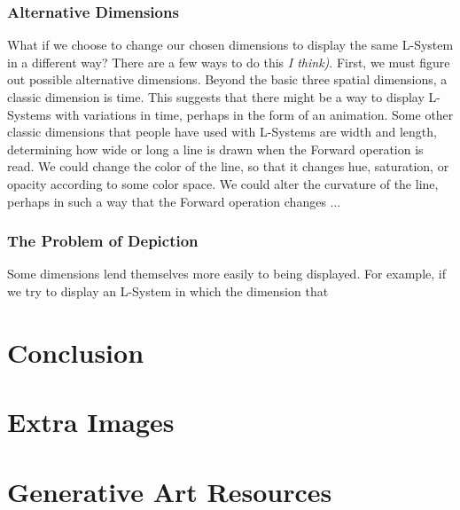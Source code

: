 \documentclass[12pt,twoside]{reedthesis}
\begin{document}
\subsection{Alternative Dimensions}
What if we choose to change our chosen dimensions to display the same L-System in a different way? There are a few ways to do this \textit{I think)}. First, we must figure out possible alternative dimensions. Beyond the basic three spatial dimensions, a classic dimension is time. This suggests that there might be a way to display L-Systems with variations in time, perhaps in the form of an animation. Some other classic dimensions that people have used with L-Systems are width and length, determining how wide or long a line is drawn when the Forward operation is read. We could change the color of the line, so that it changes hue, saturation, or opacity according to some color space. We could alter the curvature of the line, perhaps in such a way that the Forward operation changes ...

\subsection{The Problem of Depiction}

Some dimensions lend themselves more easily to being displayed. For example, if we try to display an L-System in which the dimension that 


\chapter*{Conclusion}
	\setcounter{chapter}{4}
	\setcounter{section}{0}

    \appendix
      \chapter{Extra Images}
      
      \chapter{Generative Art Resources}

\backmatter 
\nocite{*}


 
\end{document}
